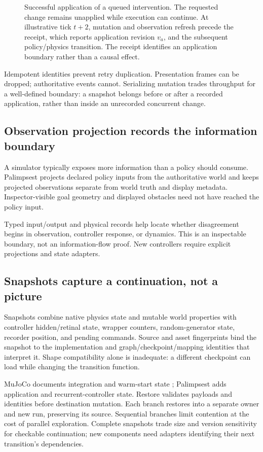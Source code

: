 \documentclass[10pt]{article}
\begin{document}
\begin{figure}[t]
\centering
\caption{Successful application of a queued intervention. The requested change
remains unapplied while execution can continue. At illustrative tick $t+2$,
mutation and observation refresh precede the receipt, which reports application
revision $v_a$, and the subsequent policy/physics transition. The receipt identifies
an application boundary rather than a causal effect.}
\label{fig:authority}
\end{figure}

Idempotent identities prevent retry duplication. Presentation frames can be
dropped; authoritative events cannot. Serializing mutation trades throughput
for a well-defined boundary: a snapshot belongs before or after a recorded
application, rather than inside an unrecorded concurrent change.

\subsection{Observation projection records the information boundary}
A simulator typically exposes more information than a policy should consume.
Palimpsest projects declared policy inputs from the authoritative world and
keeps projected observations separate from world truth and display metadata.
Inspector-visible goal geometry and displayed obstacles need not have reached
the policy input.

Typed input/output and physical records help locate whether disagreement begins in
observation, controller response, or dynamics. This is an inspectable boundary,
not an information-flow proof. New controllers require explicit projections and
state adapters.

\subsection{Snapshots capture a continuation, not a picture}
Snapshots combine native physics state and mutable world properties with
controller hidden/retinal state, wrapper counters, random-generator state,
recorder position, and pending commands. Source and asset fingerprints bind the
snapshot to the implementation and graph/checkpoint/mapping identities that
interpret it. Shape compatibility alone is inadequate: a different checkpoint
can load while changing the transition function.

MuJoCo documents integration and warm-start state \citep{mujococomputation};
Palimpsest adds application and recurrent-controller state. Restore validates
payloads and identities before destination mutation. Each branch restores into
a separate owner and new run, preserving its source. Sequential branches limit
contention at the cost of parallel exploration. Complete snapshots trade size
and version sensitivity for checkable continuation; new components need adapters
identifying their next transition's dependencies.
\end{document}

